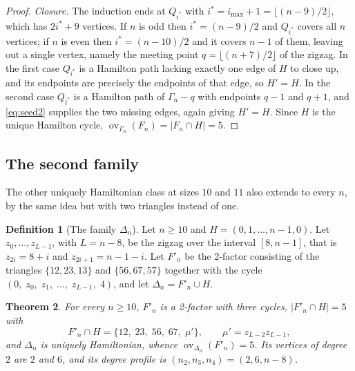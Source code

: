 \documentclass[11pt,a4paper]{article}
\newtheorem{theorem}{Theorem}[section]
\theoremstyle{definition}
\newtheorem{definition}[theorem]{Definition}
\theoremstyle{remark}
\newcommand{\ov}{\operatorname{ov}}
\begin{document}
\begin{proof}
\emph{Closure.} The induction ends at $Q_{i^*}$ with $i^*=i_{\max}+1=\lfloor (n-9)/2\rfloor$, which has $2i^*+9$ vertices. If $n$ is odd then $i^*=(n-9)/2$ and $Q_{i^*}$ covers all $n$ vertices; if $n$ is even then $i^*=(n-10)/2$ and it covers $n-1$ of them, leaving out a single vertex, namely the meeting point $q=\lfloor (n+7)/2\rfloor$ of the zigzag. In the first case $Q_{i^*}$ is a Hamilton path lacking exactly one edge of $H$ to close up, and its endpoints are precisely the endpoints of that edge, so $H'=H$. In the second case $Q_{i^*}$ is a Hamilton path of $\Gamma_n-q$ with endpoints $q-1$ and $q+1$, and \eqref{eq:seed2} supplies the two missing edges, again giving $H'=H$. Since $H$ is the unique Hamilton cycle, $\ov_{\Gamma_n}(F_n)=|F_n\cap H|=5$.
\end{proof}

\subsection{The second family}\label{sub:delta}

The other uniquely Hamiltonian class at sizes $10$ and $11$ also extends to every $n$, by the same idea but with two triangles instead of one.

\begin{definition}[The family $\Delta_n$]\label{def:delta}
Let $n\ge10$ and $H=(0,1,\dots,n-1,0)$. Let $z_0,\dots,z_{L-1}$, with $L=n-8$, be the zigzag over the interval $[8,n-1]$, that is $z_{2i}=8+i$ and $z_{2i+1}=n-1-i$. Let $F'_n$ be the 2-factor consisting of the triangles $\{12,23,13\}$ and $\{56,67,57\}$ together with the cycle $(0,\;z_0,\;z_1,\;\dots,\;z_{L-1},\;4)$, and let $\Delta_n=F'_n\cup H$.
\end{definition}

\begin{theorem}\label{thm:delta}
For every $n\ge10$, $F'_n$ is a 2-factor with \emph{three} cycles, $|F'_n\cap H|=5$ with
\[
F'_n\cap H=\{12,\;23,\;56,\;67,\;\mu'\},\qquad \mu'=z_{L-2}z_{L-1},
\]
and $\Delta_n$ is uniquely Hamiltonian, whence $\ov_{\Delta_n}(F'_n)=5$. Its vertices of degree $2$ are $2$ and $6$, and its degree profile is $(n_2,n_3,n_4)=(2,6,n-8)$.
\end{theorem}
\end{document}
